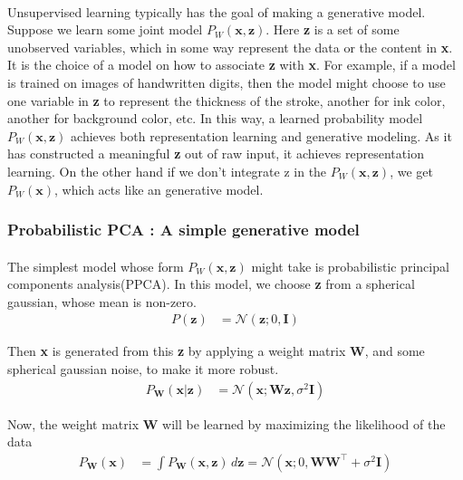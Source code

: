 \documentclass{article}
\begin{document}
    \paragraph{} Unsupervised learning typically has the goal of making a generative model. Suppose we learn some joint model $P_W(\mathbf{x,z})$. Here \textbf{z} is a set of some unobserved variables, which in some way represent the data or the content in \textbf{x}. It is the choice of a model on how to associate \textbf{z} with \textbf{x}. For example, if a model is trained on images of handwritten digits, then the model might choose to use one variable in \textbf{z} to represent the thickness of the stroke, another for ink color, another for background color, etc. In this way, a learned probability model $P_W(\mathbf{x,z})$ achieves both representation learning and generative modeling. As it has constructed a meaningful \textbf{z} out of raw input, it achieves representation learning. On the other hand if we don’t integrate z in the $P_W(\mathbf{x,z})$, we get $P_W(\mathbf{x})$, which acts like an generative model.
    \subsubsection{Probabilistic PCA : A simple generative model}
      \paragraph{} The simplest model whose form $P_W(\mathbf{x,z})$ might take is probabilistic principal components analysis(PPCA). In this model, we choose \textbf{z} from a spherical gaussian, whose mean is non-zero. 
      \begin{align*}
        P(\mathbf{z}) &= \mathcal{N}(\mathbf{z}; 0, \mathbf{I})
        \end{align*}
      
        Then \textbf{x} is generated from this \textbf{z} by applying a weight matrix \textbf{W}, and some spherical gaussian noise, to make it more robust.
        \begin{align*}
          P_{\mathbf{W}}(\mathbf{x}|\mathbf{z}) &= \mathcal{N}(\mathbf{x}; \mathbf{Wz}, \sigma^2 \mathbf{I})
        \end{align*}

          Now, the weight matrix \textbf{W} will be learned by maximizing the likelihood of the data
          \begin{align*}
            P_{\mathbf{W}}(\mathbf{x}) &= \int P_{\mathbf{W}}(\mathbf{x}, \mathbf{z}) \, d\mathbf{z} = \mathcal{N}(\mathbf{x}; 0, \mathbf{W}\mathbf{W}^\top + \sigma^2 \mathbf{I})
            \end{align*}
\end{document}
